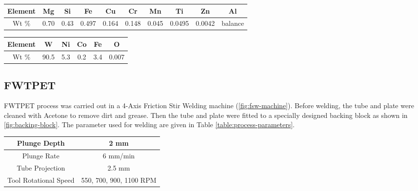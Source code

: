 \documentclass[3p]{elsarticle}
\begin{document}
\begin{table*}[!htbp]
\caption{CHEMICAL COMPOSITION OF AA6061}
\centering
\begin{tabular}{|c|c|c|c|c|c|c|c|c|c|}
\hline 
Element & Mg & Si & Fe & Cu & Cr & Mn & Ti & Zn & Al\\ 
\hline 
Wt \% & 0.70 & 0.43 & 0.497 & 0.164 & 0.148 & 0.045 & 0.0495 & 0.0042 & balance\\ 
\hline 
\end{tabular}
\label{table:AA6061-composition} %
\end{table*}

\begin{table*}[!htbp]
\caption{CHEMICAL COMPOSITION OF TOOL MATERIAL}
\centering
\begin{tabular}{|c|c|c|c|c|c|}
\hline 
Element & W & Ni & Co & Fe & O \\ 
\hline 
Wt \% & 90.5 & 5.3 & 0.2 & 3.4 & 0.007 \\ 
\hline 
\end{tabular}
\label{table:tool-composition} %
\end{table*}

\subsection{FWTPET}
\label{subsec:FWTPET}
FWTPET process was carried out in a 4-Axis Friction Stir Welding machine (\ref{fig:fsw-machine}). Before welding, the tube and plate were cleaned with Acetone to remove dirt and grease. Then the tube and plate were fitted to a specially designed backing block as shown in \ref{fig:backing-block}. The parameter used for welding are given in Table \ref{table:process-parameters}. %

\begin{table*}[!htbp]
\caption{FWTPET Process Parameters}
\centering
\begin{tabular}{|c|c|}
\hline 
Plunge Depth & 2 mm \\ 
\hline 
Plunge Rate & 6 mm/min \\ 
\hline 
Tube Projection & 2.5 mm \\ 
\hline 
Tool Rotational Speed & 550, 700, 900, 1100 RPM \\ 
\hline 
\end{tabular} 
\label{table:process-parameters} %
\end{table*}
\end{document}

